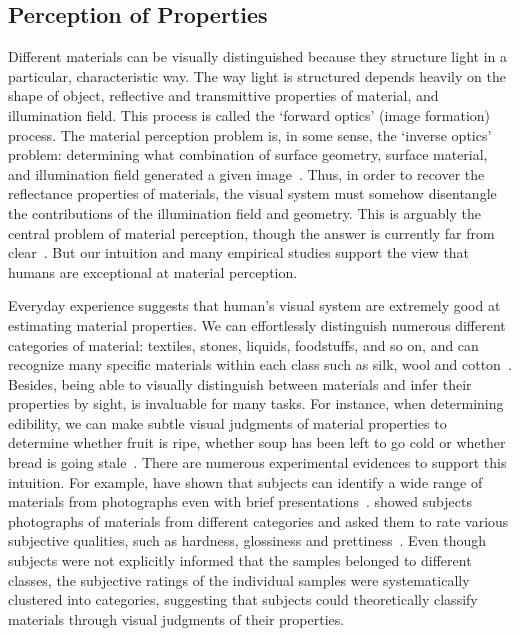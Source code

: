 \subsection{Perception of Properties}
\label{sec:prop_percept}
Different materials can be visually distinguished because they structure light in a particular, characteristic way. The way light is structured depends heavily on the shape of object, reflective and transmittive properties of material, and illumination field. This process is called the `forward optics' (image formation) process. The material perception problem is, in some sense, the `inverse optics' problem: determining what combination of surface geometry, surface material, and illumination field generated a given image~\cite{anderson2011visual}. Thus, in order to recover the reflectance properties of materials, the visual system must somehow disentangle the contributions of the illumination field and geometry. This is arguably the central problem of material perception, though the answer is currently far from clear~\cite{anderson2011visual}. But our intuition and many empirical studies support the view that humans are exceptional at material perception.

Everyday experience suggests that human's visual system are extremely good at estimating material properties. We can effortlessly distinguish numerous different categories of material: textiles, stones, liquids, foodstuffs, and so on, and can recognize many specific materials within each class such as silk, wool and cotton~\cite{fleming2014visual}. Besides, being able to visually distinguish between materials and infer their properties by sight, is invaluable for many tasks. For instance, when determining edibility, we can make subtle visual judgments of material properties to determine whether fruit is ripe, whether soup has been left to go cold or whether bread is going stale~\cite{fleming2014visual}. There are numerous experimental evidences to support this intuition. For example, \citeauthor{sharan2009material} have shown that subjects can identify a wide range of materials from photographs even with brief presentations~\cite{sharan2009material}. \citeauthor{fleming2013perceptual} showed subjects photographs of materials from different categories and asked them to rate various subjective qualities, such as hardness, glossiness and prettiness~\cite{fleming2013perceptual}. Even though subjects were not explicitly informed that the samples belonged to different classes, the subjective ratings of the individual samples were systematically clustered into categories, suggesting that subjects could theoretically classify materials through visual judgments of their properties.

